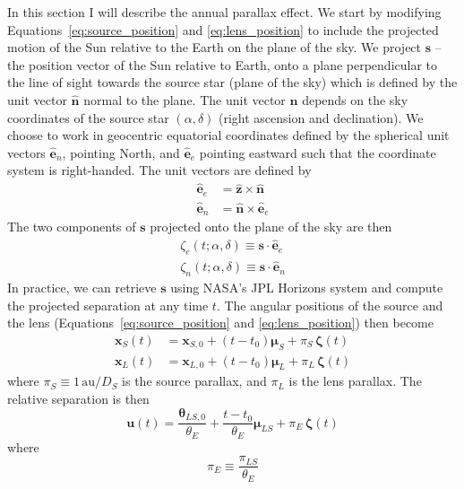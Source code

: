 \documentclass[12pt,dvipsnames]{report}
\renewcommand{\vec}[1]{\boldsymbol{\mathbf{#1}}}
\begin{document}
In this section I will describe the annual parallax effect. We start by
modifying Equations~\ref{eq:source_position} and \ref{eq:lens_position} to
include the projected motion of the Sun relative to the Earth on the plane of
the sky. We project $\mathbf s$ -- the position vector of the Sun relative to
Earth, onto a plane perpendicular to the line of sight towards the source star
(plane of the sky) which is defined by the unit vector $\boldsymbol{\hat n}$
normal to the plane. The unit vector $\boldsymbol{\hat n}$ depends on the sky
coordinates of the source star $(\alpha,\delta)$ (right ascension and
declination). We choose to work in geocentric equatorial coordinates defined by
the spherical unit vectors $\hat{\mathbf e}_n$, pointing North, and
$\hat{\mathbf e}_e$ pointing eastward such that the coordinate system is
right-handed. The unit vectors are defined by
\begin{align}
    \hat{\mathbf e}_e & = \hat{\mathbf z}\times \hat{\mathbf n}  \\
    \hat{\mathbf e}_n & = \hat{\mathbf n}\times\hat{\mathbf e}_e
\end{align}
The two components of $\mathbf s$ projected onto the plane of the sky are then
\begin{align}
    \zeta_e(t;\alpha,\delta)\equiv \mathbf s\cdot \hat{\mathbf e}_e \\
    \zeta_n(t;\alpha,\delta)\equiv \mathbf s\cdot \hat{\mathbf e}_n
\end{align}
In practice, we can retrieve $\mathbf{s}$ using NASA's JPL Horizons system and compute
the projected separation at any time $t$.
The angular positions of the source and the lens
(Equations~\ref{eq:source_position} and \ref{eq:lens_position}) then become
\begin{align}
    \vec{x}_S(t) & = \vec{x}_{S,0}+(t-t_0)\boldsymbol{\mu}_S
    +\pi_S\,\boldsymbol{\zeta}(t)                            \\
    \vec{x}_L(t) & = \vec{x}_{L,0}+(t-t_0)\boldsymbol{\mu}_L
    +\pi_L\,\boldsymbol{\zeta}(t)
\end{align}
where  $\pi_S\equiv 1\,\mathrm{au}/D_S$ is the source parallax, and $\pi_L$ is the
lens parallax.
The relative separation is then
\begin{equation}
    \boldsymbol{u}(t)= \frac{\boldsymbol\theta_{LS, 0}}{\theta_E}
    +\frac{t-t_0}{\theta_E}\boldsymbol{\mu}_{LS}+\pi_{E}\,\boldsymbol{\zeta}(t)
    \label{eq:relative_separation_parallax}
\end{equation}
where
\begin{equation}
    \pi_E\equiv \frac{\pi_{LS}}{\theta_E}
    \label{eq:pi_E}
\end{equation}
\end{document}
